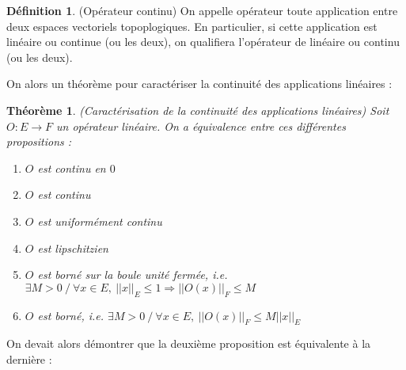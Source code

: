 \documentclass[a4paper,11pt]{article}
\theoremstyle{plain}
\newtheorem*{theo}{Théorème}
\theoremstyle{definition}
\newtheorem*{defi}{Définition}
\begin{document}
\begin{defi} (Opérateur continu)
On appelle opérateur toute application entre deux espaces vectoriels topoplogiques.
En particulier, si cette application est linéaire ou continue (ou les deux), on qualifiera l'opérateur de linéaire ou continu (ou les deux).
\end{defi}

On alors un théorème pour caractériser la continuité des applications linéaires :
\begin{theo} (Caractérisation de la continuité des applications linéaires)
Soit $O : E \to F$ un opérateur linéaire.
On a équivalence entre ces différentes propositions :
\begin{enumerate}
	\item $O$ est continu en $0$
	\item $O$ est continu
	\item $O$ est uniformément continu
	\item $O$ est lipschitzien
	\item $O$ est borné sur la boule unité fermée, i.e. $\exists M > 0 \ / \ \forall x \in E, \ ||x||_E \leq 1 \Rightarrow ||O(x)||_{F} \leq M$
	\item $O$ est borné, i.e. $\exists M > 0 \ / \ \forall x \in E, \ ||O(x)||_{F} \leq M||x||_{E}$
\end{enumerate}
\end{theo}
On devait alors démontrer que la deuxième proposition est équivalente à la dernière :
\end{document}
